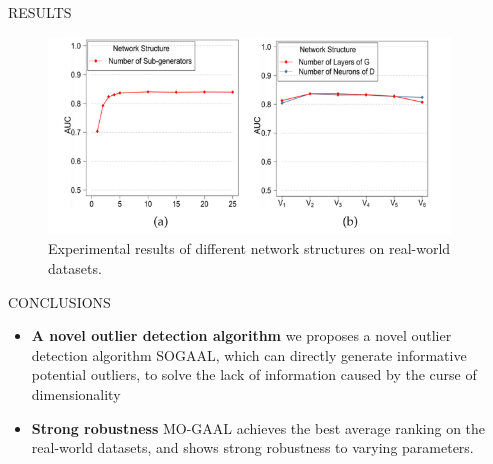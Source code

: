 \documentclass[final]{beamer}
\newlength{\sepwidth}
\newlength{\colwidth}
\newcommand{\separatorcolumn}{\begin{column}{\sepwidth}\end{column}}
\begin{document}
\begin{frame}[t]
\begin{columns}[t]
\begin{column}{\colwidth}
\begin{block}{RESULTS}
	\begin{figure}
		\centering
		\includegraphics[scale=1.8]{figures/Result 2.png}
		\caption{Experimental results of different network structures on real-world datasets.}
	\end{figure}

  \end{block}

  \begin{block}{CONCLUSIONS}
  	
  	\begin{itemize}
  	\item \textbf{A novel outlier detection algorithm} we proposes a novel outlier detection algorithm SOGAAL, which can directly generate informative potential outliers, to solve the lack of information caused by the curse of dimensionality \\
  	\item \textbf{Strong robustness} MO-GAAL achieves the best average ranking on the real-world datasets, and shows strong robustness to varying parameters.
  	\end{itemize}
  
  \end{block}

\end{column}

\separatorcolumn
\end{columns}
\end{frame}
\end{document}
